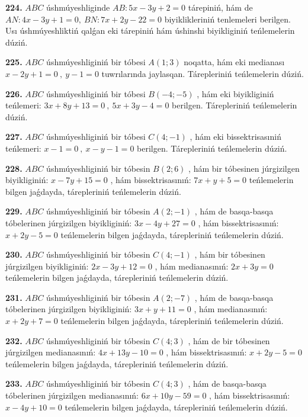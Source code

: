 \documentclass{article}
\begin{document}
\textbf{224.} $ABC$ úshmúyeshliginde \(AB:5x - 3y + 2 = 0\) 
tárepiniń, hám de \(AN:4x - 3y + 1 = 0,\ BN:7x + 2y - 22 = 0\) 
biyiklikleriniń tenlemeleri berilgen. Usı úshmúyeshliktiń qalǵan eki
tárepiniń hám úshinshi biyikliginiń teńlemelerin dúziń.

\textbf{225.} $ABC$ úshmúyeshliginiń bir tóbesi \(A(1;3)\) noqatta,
hám eki medianası \(x - 2y + 1 = 0\ ,\ y - 1 = 0\) tuwrılarında
jaylasqan. Tárepleriniń teńlemelerin dúziń.

\textbf{226.} $ABC$ úshmúyeshliginiń bir tóbesi \(B( - 4; - 5)\) ,
hám eki biyikliginiń teńlemeri:
\(3x + 8y + 13 = 0\ ,\ 5x + 3y - 4 = 0\) berilgen. Tárepleriniń
teńlemelerin dúziń.

\textbf{227.} $ABC$ úshmúyeshliginiń bir tóbesi \(C(4; - 1)\) , hám
eki bissektrisasıniń teńlemeri: \(x - 1 = 0\ ,\ x - y - 1 = 0\) 
berilgen. Tárepleriniń teńlemelerin dúziń.

\textbf{228.} $ABC$ úshmúyeshliginiń bir tóbesin \(B(2;6)\) , hám
bir tóbesinen júrgizilgen biyikliginiń: \(x - 7y + 15 = 0\) , hám
bissektrisasınıń: \(7x + y + 5 = 0\) teńlemelerin bilgen jaǵdayda,
tárepleriniń teńlemelerin dúziń.

\textbf{229.} $ABC$ úshmúyeshliginiń bir tóbesin \(A(2; - 1)\) , hám
de basqa-basqa tóbelerinen júrgizilgen biyikliginiń:
\(3x - 4y + 27 = 0\) , hám bissektrisasınıń: \(x + 2y - 5 = 0\) 
teńlemelerin bilgen jaǵdayda, tárepleriniń teńlemelerin dúziń.

\textbf{230.} $ABC$ úshmúyeshliginiń bir tóbesin \(C(4; - 1)\) , hám
bir tóbesinen júrgizilgen biyikliginiń: \(2x - 3y + 12 = 0\) , hám
medianasınıń: \(2x + 3y = 0\) teńlemelerin bilgen jaǵdayda, tárepleriniń
teńlemelerin dúziń.

\textbf{231.} $ABC$ úshmúyeshliginiń bir tóbesin \(A(2; - 7)\) , hám
de basqa-basqa tóbelerinen júrgizilgen biyikliginiń:
\(3x + y + 11 = 0\) , hám medianasınıń: \(x + 2y + 7 = 0\) teńlemelerin
bilgen jaǵdayda, tárepleriniń teńlemelerin dúziń.

\textbf{232.} $ABC$ úshmúyeshliginiń bir tóbesin \(C(4;3)\) , hám de
bir tóbesinen júrgizilgen medianasınıń: \(4x + 13y - 10 = 0\) , hám
bissektrisasınıń: \(x + 2y - 5 = 0\) teńlemelerin bilgen jaǵdayda,
tárepleriniń teńlemelerin dúziń.

\textbf{233.} $ABC$ úshmúyeshliginiń bir tóbesin \(C(4;3)\) , hám de
basqa-basqa tóbelerinen júrgizilgen medianasınıń:
\(6x + 10y - 59 = 0\) , hám bissektrisasınıń: \(x - 4y + 10 = 0\) 
teńlemelerin bilgen jaǵdayda, tárepleriniń teńlemelerin dúziń.
\end{document}
